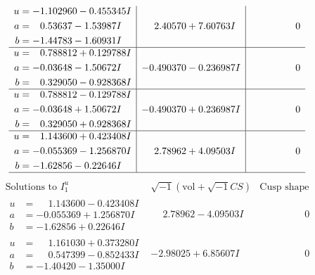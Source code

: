 \documentclass[1p]{elsarticle_modified}
\theoremstyle{definition}
\newcommand{\I}{\sqrt{-1}}
\begin{document}
$$\begin{array}{c|c|c}
\begin{aligned}
u &= -1.102960 - 0.455345 I \\
a &= \phantom{-}0.53637 - 1.53987 I \\
b &= -1.44783 - 1.60931 I\end{aligned}
 & \phantom{-}2.40570 + 7.60763 I & \phantom{-0.000000 } 0 \\ \hline\begin{aligned}
u &= \phantom{-}0.788812 + 0.129788 I \\
a &= -0.03648 - 1.50672 I \\
b &= \phantom{-}0.329050 - 0.928368 I\end{aligned}
 & -0.490370 - 0.236987 I & \phantom{-0.000000 } 0 \\ \hline\begin{aligned}
u &= \phantom{-}0.788812 - 0.129788 I \\
a &= -0.03648 + 1.50672 I \\
b &= \phantom{-}0.329050 + 0.928368 I\end{aligned}
 & -0.490370 + 0.236987 I & \phantom{-0.000000 } 0 \\ \hline\begin{aligned}
u &= \phantom{-}1.143600 + 0.423408 I \\
a &= -0.055369 - 1.256870 I \\
b &= -1.62856 - 0.22646 I\end{aligned}
 & \phantom{-}2.78962 + 4.09503 I & \phantom{-0.000000 } 0\\
 \hline 
 \end{array}$$\newpage$$\begin{array}{c|c|c}  
\text{Solutions to }I^u_{1}& \I (\text{vol} + \sqrt{-1}CS) & \text{Cusp shape}\\
 \hline 
\begin{aligned}
u &= \phantom{-}1.143600 - 0.423408 I \\
a &= -0.055369 + 1.256870 I \\
b &= -1.62856 + 0.22646 I\end{aligned}
 & \phantom{-}2.78962 - 4.09503 I & \phantom{-0.000000 } 0 \\ \hline\begin{aligned}
u &= \phantom{-}1.161030 + 0.373280 I \\
a &= \phantom{-}0.547399 - 0.852433 I \\
b &= -1.40420 - 1.35000 I\end{aligned}
 & -2.98025 + 6.85607 I & \phantom{-0.000000 } 0 \\ \hline\begin{aligned}

\end{aligned}
\end{array}$$
\end{document}
